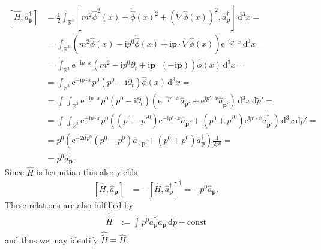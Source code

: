 \documentclass[english, parskip=full]{scrartcl}
\newcommand{\intx}{}
\newcommand{\intr}{}
\newcommand{\kla}{}
\newcommand{\klam}{}
\newcommand{\tecxt}{}
\renewcommand{\i}{\text{i}}
\newcommand{\e}{\text{e}}
\begin{document}
\begin{align}
\klam\left[ \hat{H}, \hat{a}_\textbf{p}^\dagger \right] &= \frac{1}{2} \intr\int_{\mathbb{R}^{3}} \klam\left[ m^2\hat{\phi}^2(x) + \dot{\hat{\phi}}(x)^2 + \kla\left( \nabla\hat{\phi}(x) \right)^2, \hat{a}_\textbf{p}^\dagger \right] \, \mathrm{d}^{3}x = \\
&= \intr\int_{\mathbb{R}^{3}} \kla\left( m^2 \hat{\phi}(x) - \i p^0 \dot{\hat{\phi}}(x) + \i\textbf{p}\cdot \nabla\hat{\phi}(x) \right) \e^{-\i p\cdot x} \, \mathrm{d}^{3}x = \\
&= \intr\int_{\mathbb{R}^{3}} \e^{-\i p\cdot x} \left( m^2 - \i p^0 \partial_t +\i\textbf{p} \cdot (-\i\textbf{p}) \right) \hat{\phi}(x) \, \mathrm{d}^{3}x = \\
&= \intr\int_{\mathbb{R}^{3}} \e^{-\i p\cdot x} p^0 \left( p^0 - \i\partial_t  \right) \hat{\phi}(x) \, \mathrm{d}^{3}x = \\
&= \intx\int_{ }^{ } \intr\int_{\mathbb{R}^{3}} \e^{-\i p\cdot x} p^0 \left( p^0 - \i\partial_t \right) \kla\left( \e^{-\i p'\cdot x} \hat{a}_{\textbf{p}'} + \e^{\i p'\cdot x} \hat{a}_{\textbf{p}'}^\dagger \right)  \, \mathrm{d}^{3}x \, \mathrm{d}\tilde{p}' = \\
&= \intx\int_{ }^{ } \intr\int_{\mathbb{R}^{3}} \e^{-\i p\cdot x} p^0  \kla\left( \left( p^0 - p'^0 \right) \e^{-\i p'\cdot x} \hat{a}_{\textbf{p}'} + \left( p^0 + p'^0 \right) \e^{\i p'\cdot x} \hat{a}_{\textbf{p}'}^\dagger \right)  \, \mathrm{d}^{3}x \, \mathrm{d}\tilde{p}' = \\
&= p^0 \kla\left( \e^{-2\i tp^0} \kla\left( p^0 - p^0 \right) \hat{a}_{-\textbf{p}} + \kla\left( p^0 + p^0 \right) \hat{a}_\textbf{p}^\dagger \right) \frac{1}{2p^0} = \\
&= p^0 \hat{a}_\textbf{p}^\dagger.
\end{align}
Since $\hat{H}$ is hermitian this also yields
\begin{align}
\left[ \hat{H}, \hat{a}_\textbf{p} \right] &= -\left[ \hat{H}, \hat{a}_\textbf{p}^\dagger \right]^\dagger = -p^0 \hat{a}_\textbf{p}. 
\end{align}
These relations are also fulfilled by 
\begin{align}
\hat{\tilde{H}} &:= \intx\int_{ }^{ } p^0 \hat{a}_\textbf{p}^\dagger \hat{a}_\textbf{p} \, \mathrm{d}\tilde{p} + \tecxt\text{const}
\end{align}
and thus we may identify $\hat{\tilde{H}} \equiv \hat{H}$.
\end{document}
